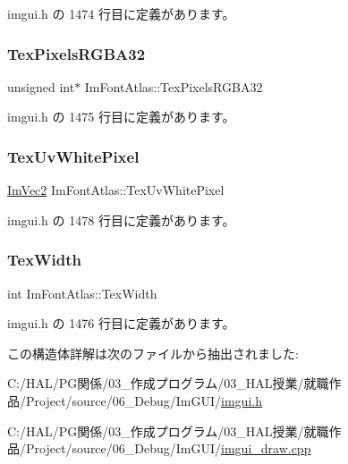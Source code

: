  imgui.\+h の 1474 行目に定義があります。

\mbox{\label{struct_im_font_atlas_a41163489a5b8060f405c56e22590cba5}} 
\subsubsection{\texorpdfstring{Tex\+Pixels\+R\+G\+B\+A32}{TexPixelsRGBA32}}
{\footnotesize\ttfamily unsigned int$\ast$ Im\+Font\+Atlas\+::\+Tex\+Pixels\+R\+G\+B\+A32}



 imgui.\+h の 1475 行目に定義があります。

\mbox{\label{struct_im_font_atlas_af1d05221e9a1607d7f625df92a4f9b7e}} 
\subsubsection{\texorpdfstring{Tex\+Uv\+White\+Pixel}{TexUvWhitePixel}}
{\footnotesize\ttfamily \mbox{\hyperlink{struct_im_vec2}{Im\+Vec2}} Im\+Font\+Atlas\+::\+Tex\+Uv\+White\+Pixel}



 imgui.\+h の 1478 行目に定義があります。

\mbox{\label{struct_im_font_atlas_a2d0662502433e7a87b3aa4681ba17aa3}} 
\subsubsection{\texorpdfstring{Tex\+Width}{TexWidth}}
{\footnotesize\ttfamily int Im\+Font\+Atlas\+::\+Tex\+Width}



 imgui.\+h の 1476 行目に定義があります。



この構造体詳解は次のファイルから抽出されました\+:\begin{DoxyCompactItemize}
\item 
C\+:/\+H\+A\+L/\+P\+G関係/03\+\_\+作成プログラム/03\+\_\+\+H\+A\+L授業/就職作品/\+Project/source/06\+\_\+\+Debug/\+Im\+G\+U\+I/\mbox{\hyperlink{imgui_8h}{imgui.\+h}}\item 
C\+:/\+H\+A\+L/\+P\+G関係/03\+\_\+作成プログラム/03\+\_\+\+H\+A\+L授業/就職作品/\+Project/source/06\+\_\+\+Debug/\+Im\+G\+U\+I/\mbox{\hyperlink{imgui__draw_8cpp}{imgui\+\_\+draw.\+cpp}}\end{DoxyCompactItemize}
